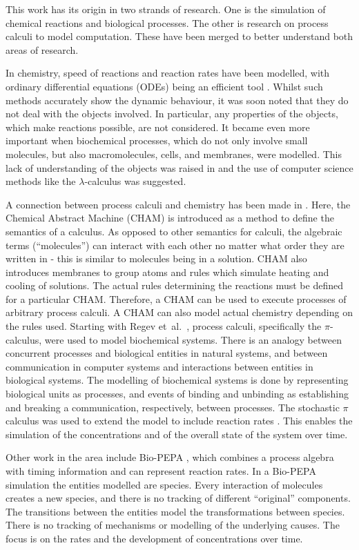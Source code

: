 ﻿This work has its origin in two strands of research. One is the simulation of chemical reactions and biological processes. The other is research on process calculi to model computation. These have been merged  to better understand both areas of research. 

In chemistry, speed of reactions and reaction rates have been modelled, with ordinary differential equations (ODEs) being an efficient tool \cite{higham}. Whilst such methods accurately show the dynamic behaviour, it was soon noted that they do not deal with the objects involved. In particular, any properties of the objects, which make reactions possible, are not considered. 
It became even more important when biochemical processes, which do not only involve small molecules, but also macromolecules, cells, and membranes, were modelled. This lack of understanding of the objects was raised in \cite{fontana} and the use of computer science methods like the $\lambda$-calculus was suggested. 

A connection between process calculi and chemistry has been made in \cite{chamjournal}. Here, the Chemical Abstract Machine (CHAM) is introduced as a method to define the semantics of a calculus. As opposed to other semantics for calculi, the algebraic terms (``molecules'') can interact with each other no matter what order they are written in - this is similar to molecules being in a solution. CHAM also introduces membranes to group atoms and rules which simulate heating and cooling of solutions. The actual rules determining the reactions must be defined for a particular CHAM. Therefore, a CHAM can be used to execute processes of arbitrary process calculi. A CHAM can also model actual chemistry depending on the rules used. Starting with Regev et~al.~\cite{regev2000}, process calculi, specifically the $\pi$-calculus, were used to model biochemical systems. There is an analogy between concurrent processes and biological entities in natural systems, and between communication in computer systems and interactions between entities in biological systems. The modelling of biochemical systems is done by representing biological units as processes, and events of binding and unbinding as establishing and breaking a communication, respectively, between processes. The stochastic $\pi$ calculus \cite{PriamiStochasticPi} was used to extend the model to include reaction rates \cite{PriameRegev}. This enables the simulation of the concentrations and of the overall state of the system over time. 

Other work in the area include Bio-PEPA \cite{CiocchettaBiopepa}, which combines a process algebra with timing information and can represent reaction rates. In a Bio-PEPA simulation the entities modelled are species. Every interaction of molecules creates a new species, and there is no tracking of different ``original'' components. The transitions between the entities model the transformations between species. There is no tracking of mechanisms or modelling of the underlying causes. The focus is on the rates and the development of concentrations over time.  

